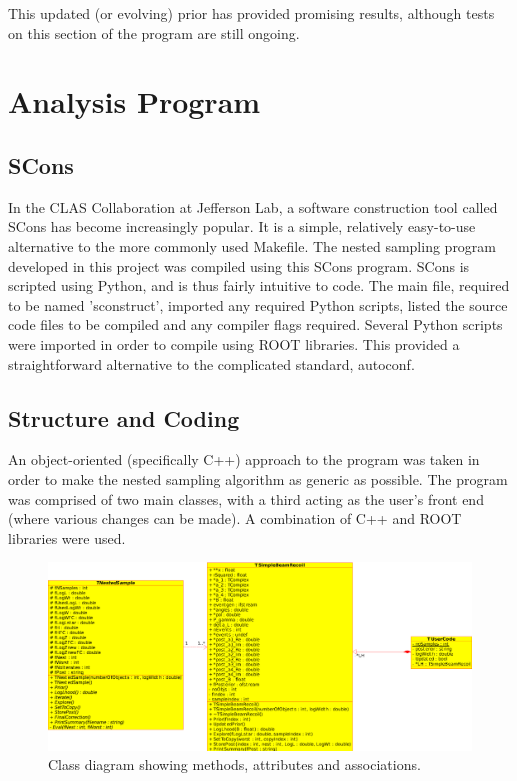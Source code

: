 \documentclass[a4paper,12pt]{article}
\begin{document}
This updated (or evolving) prior has provided promising results, although tests on this section of the program are still ongoing.

\section{Analysis Program}
\subsection{SCons}
In the CLAS Collaboration at Jefferson Lab, a software construction tool called SCons\cite{scons} has become increasingly popular.  It is a simple, relatively easy-to-use alternative to the more commonly used Makefile.  The nested sampling program developed in this project was compiled using this SCons program.  SCons is scripted using Python, and is thus fairly intuitive to code.  The main file, required to be named 'sconstruct', imported any required Python scripts, listed the source code files to be compiled and any compiler flags required. Several Python scripts were imported in order to compile using ROOT libraries.  This provided a straightforward alternative to the complicated standard, autoconf.


 
\subsection{Structure and Coding}
An object-oriented (specifically C++) approach to the program was taken in order to make the nested sampling algorithm as generic as possible.  The program was comprised of two main classes, with a third acting as the user's front end (where various changes can be made). A combination of C++ and ROOT libraries were used.  
\newline

\begin{figure}[!h]
 \begin{center}
  \includegraphics[scale=0.5]{class_diagram.eps}
  \caption{Class diagram showing methods, attributes and associations.}
 \end{center}
\end{figure}
\end{document}
